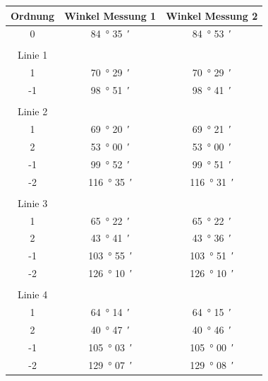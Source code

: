 \documentclass[12pt,a4paper]{article}
\begin{document}
	\begin{table}
		\centering
		\begin{tabular}{|c|c|c|}
			\hline
			Ordnung & Winkel Messung 1 & Winkel Messung 2 \\
			\hline
			\hline
			0 & \SI{84}{\degree} \SI{35}{\arcminute} &  \SI{84}{\degree} \SI{53}{\arcminute} \\
			\hline
			&&\\
			Linie 1&& \\
			\hline
			1 & \SI{70}{\degree} \SI{29}{\arcminute} & \SI{70}{\degree} \SI{29}{\arcminute} \\
			\hline
			-1 & \SI{98}{\degree} \SI{51}{\arcminute} & \SI{98}{\degree} \SI{41}{\arcminute} \\
			\hline
			
			&&\\
			Linie 2&& \\
			\hline
			1 & \SI{69}{\degree} \SI{20}{\arcminute} & \SI{69}{\degree} \SI{21}{\arcminute} \\
			\hline
			2 & \SI{53}{\degree} \SI{00}{\arcminute} & \SI{53}{\degree} \SI{00}{\arcminute} \\
			\hline
			-1 & \SI{99}{\degree} \SI{52}{\arcminute} & \SI{99}{\degree} \SI{51}{\arcminute} \\
			\hline
			-2 & \SI{116}{\degree} \SI{35}{\arcminute} & \SI{116}{\degree} \SI{31}{\arcminute} \\
			\hline
			
			&&\\
			Linie 3&&\\
			\hline
			1 & \SI{65}{\degree} \SI{22}{\arcminute} & \SI{65}{\degree} \SI{22}{\arcminute} \\
			\hline
			2 & \SI{43}{\degree} \SI{41}{\arcminute} & \SI{43}{\degree} \SI{36}{\arcminute} \\
			\hline
			-1 & \SI{103}{\degree} \SI{55}{\arcminute} & \SI{103}{\degree} \SI{51}{\arcminute} \\
			\hline
			-2 & \SI{126}{\degree} \SI{10}{\arcminute} & \SI{126}{\degree} \SI{10}{\arcminute} \\
			\hline
			
			&&\\
			Linie 4&&\\
			\hline
			1 & \SI{64}{\degree} \SI{14}{\arcminute} & \SI{64}{\degree} \SI{15}{\arcminute} \\
			\hline
			2 & \SI{40}{\degree} \SI{47}{\arcminute} & \SI{40}{\degree} \SI{46}{\arcminute} \\
			\hline
			-1 & \SI{105}{\degree} \SI{03}{\arcminute} & \SI{105}{\degree} \SI{00}{\arcminute} \\
			\hline
			-2 & \SI{129}{\degree} \SI{07}{\arcminute} & \SI{129}{\degree} \SI{08}{\arcminute} \\
			\hline
			

\end{tabular}
\end{table}
\end{document}
